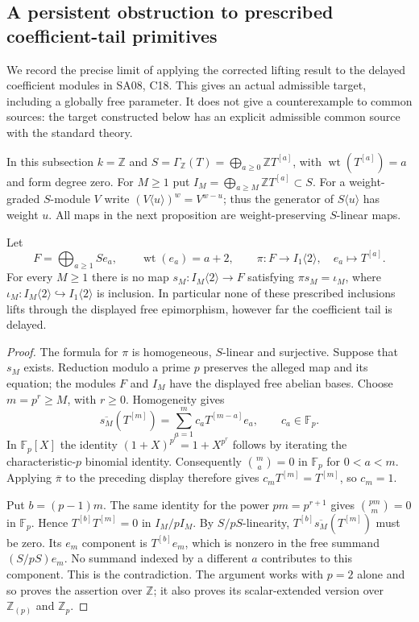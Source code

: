 \subsection{A persistent obstruction to prescribed coefficient-tail primitives}
\label{sec:B-tail-obstruction}

We record the precise limit of applying the corrected lifting result
to the delayed coefficient modules in SA08, C18.  This gives an actual
admissible target, including a globally free parameter.  It does not
give a counterexample to common sources: the target constructed below
has an explicit admissible common source with the standard theory.

In this subsection $k=\mathbb Z$ and
$S=\Gamma_{\mathbb Z}(T)=\bigoplus_{a\geq0}\mathbb Z T^{[a]}$,
with $\operatorname{wt}(T^{[a]})=a$ and form degree zero.
For $M\geq1$ put
$I_M=\bigoplus_{a\geq M}\mathbb Z T^{[a]}\subset S$.
For a weight-graded $S$-module $V$ write
$(V\langle u\rangle)^w=V^{w-u}$; thus the generator of
$S\langle u\rangle$ has weight $u$.  All maps in the next
proposition are weight-preserving $S$-linear maps.

\begin{proposition}
\label{AL01}
Let
\[
 F=\bigoplus_{a\geq1} S e_a,\qquad
 \operatorname{wt}(e_a)=a+2,\qquad
 \pi:F\longrightarrow I_1\langle2\rangle,\quad
 e_a\longmapsto T^{[a]} .
 \tag{AL.1}
\]
For every $M\geq1$ there is no map
$s_M:I_M\langle2\rangle\to F$ satisfying
$\pi s_M=\iota_M$, where
$\iota_M:I_M\langle2\rangle\hookrightarrow I_1\langle2\rangle$
is inclusion.  In particular none of these prescribed inclusions
lifts through the displayed free epimorphism, however far the
coefficient tail is delayed.
\end{proposition}

\begin{proof}
The formula for $\pi$ is homogeneous, $S$-linear and surjective.
Suppose that $s_M$ exists.  Reduction modulo a prime $p$ preserves
the alleged map and its equation; the modules $F$ and $I_M$ have the
displayed free abelian bases.  Choose $m=p^r\geq M$, with $r\geq0$.
Homogeneity gives
\[
 \overline{s_M}(T^{[m]})
   =\sum_{a=1}^{m}c_aT^{[m-a]}e_a,\qquad c_a\in\mathbb F_p .
\]
In $\mathbb F_p[X]$ the identity
$(1+X)^{p^r}=1+X^{p^r}$ follows by iterating the characteristic-$p$
binomial identity.  Consequently
$\binom{m}{a}=0$ in $\mathbb F_p$ for $0<a<m$.
Applying $\overline\pi$ to the preceding display therefore gives
$c_mT^{[m]}=T^{[m]}$, so $c_m=1$.

Put $b=(p-1)m$.  The same identity for the power $pm=p^{r+1}$
gives $\binom{pm}{m}=0$ in $\mathbb F_p$.  Hence
$T^{[b]}T^{[m]}=0$ in $I_M/pI_M$.  By $S/pS$-linearity,
$T^{[b]}\overline{s_M}(T^{[m]})$ must be zero.
Its $e_m$ component is $T^{[b]}e_m$, which is nonzero in the free
summand $(S/pS)e_m$.  No summand indexed by a different $a$
contributes to this component.  This is the contradiction.
The argument works with $p=2$ alone and so proves the assertion
over $\mathbb Z$; it also proves its scalar-extended version over
$\mathbb Z_{(p)}$ and $\mathbb Z_p$.
\end{proof}

